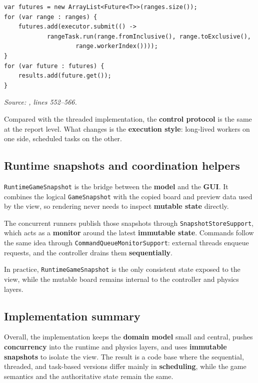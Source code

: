 \begin{lstlisting}[style=codestyle,caption={Task submission and synchronization},label={lst:taskbased-futures}]
var futures = new ArrayList<Future<T>>(ranges.size());
for (var range : ranges) {
    futures.add(executor.submit(() ->
            rangeTask.run(range.fromInclusive(), range.toExclusive(),
                    range.workerIndex())));
}
for (var future : futures) {
    results.add(future.get());
}
\end{lstlisting}

\noindent\textit{Source: , lines 552--566.}

Compared with the threaded implementation, the \textbf{control protocol} is the same at the report level. What changes is the \textbf{execution style}: long-lived workers on one side, scheduled tasks on the other.

\subsection{Runtime snapshots and coordination helpers}

\texttt{RuntimeGameSnapshot} is the bridge between the \textbf{model} and the \textbf{GUI}. It combines the logical \texttt{GameSnapshot} with the copied board and preview data used by the view, so rendering never needs to inspect \textbf{mutable state} directly.

The concurrent runners publish those snapshots through \texttt{SnapshotStoreSupport}, which acts as a \textbf{monitor} around the latest \textbf{immutable state}. Commands follow the same idea through \texttt{CommandQueueMonitorSupport}: external threads enqueue requests, and the controller drains them \textbf{sequentially}.

In practice, \texttt{RuntimeGameSnapshot} is the only consistent state exposed to the view, while the mutable board remains internal to the controller and physics layers.

\subsection{Implementation summary}

Overall, the implementation keeps the \textbf{domain model} small and central, pushes \textbf{concurrency} into the runtime and physics layers, and uses \textbf{immutable snapshots} to isolate the view. The result is a code base where the sequential, threaded, and task-based versions differ mainly in \textbf{scheduling}, while the game semantics and the authoritative state remain the same.
